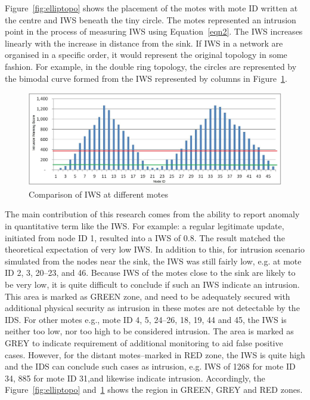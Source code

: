 \documentclass[conference]{IEEEtran}
\begin{document}
Figure~\ref{fig:elliptopo} shows the placement of the motes with mote ID written at the centre and IWS beneath the tiny circle.
The motes represented an intrusion point in the process of measuring IWS using Equation~\ref{eqn2}.
The IWS increases linearly with the increase in distance from the sink.
If IWS in a network are organised in a specific order, it would represent the original topology in some fashion.
For example, in the double ring topology, the circles are represented by the bimodal curve formed from the IWS represented by columns in Figure~\ref{fig:ellipgraph}.
\begin{figure}[tbph!]
	\centering
        \includegraphics[width=\linewidth]{DR_Column}
        \caption{Comparison of IWS at different motes}
        \label{fig:ellipgraph}
\end{figure}

The main contribution of this research comes from the ability to report anomaly in quantitative term like the IWS.
For example:  a regular legitimate update, initiated from node ID 1, resulted into a IWS of 0.8.
The result matched the theoretical expectation of very low IWS.
In addition to this, for intrusion scenario simulated from the nodes near the sink, the IWS was still fairly low, e.g. at mote ID 2, 3, 20--23, and 46. 
Because IWS of the motes close to the sink are likely to be very low, it is quite difficult to conclude if such an IWS indicate an intrusion.
This area is marked as GREEN zone, and need to be adequately secured with additional physical security as intrusion in these motes are not detectable by the IDS.
For other motes e.g., mote ID 4, 5, 24--26, 18, 19, 44 and 45, the IWS is neither too low, nor too high to be considered intrusion. The area is marked as GREY to indicate requirement of additional monitoring to aid false positive cases.
However, for the distant motes--marked in RED zone, the IWS is quite high and the IDS can conclude such cases as intrusion, e.g. IWS of 1268 for mote ID 34, 885 for mote ID 31,and likewise indicate intrusion.
Accordingly, the Figure~\ref{fig:elliptopo} and~\ref{fig:ellipgraph} shows the region in GREEN, GREY and RED zones.%
\end{document}

